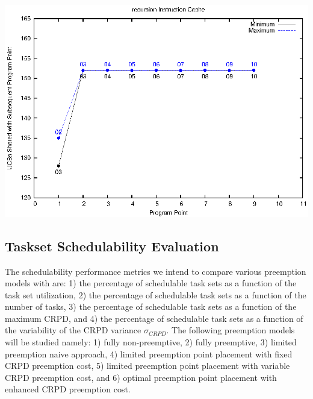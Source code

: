 \begin{center}
  \includegraphics[width=\linewidth]{eps/recursion-icache.eps}
\end{center}

\clearpage

\subsection {Taskset Schedulability Evaluation}\label{sec:taskset schedulability}
The schedulability performance metrics we intend to compare various
preemption models with are: 1) the percentage of schedulable task sets
as a function of the task set utilization, 2) the percentage of
schedulable task sets as a function of the number of tasks, 3) the
percentage of schedulable task sets as a function of the maximum CRPD,
and 4) the percentage of schedulable task sets as a function of the
variability of the CRPD variance \begin{math}\sigma_{CRPD}\end{math}.
The following preemption models will be studied namely: 1) fully
non-preemptive, 2) fully preemptive, 3) limited preemption naive
approach, 4) limited preemption point placement with fixed CRPD
preemption cost, 5) limited preemption point placement with variable
CRPD preemption cost, and 6) optimal preemption point placement with
enhanced CRPD preemption cost. 

